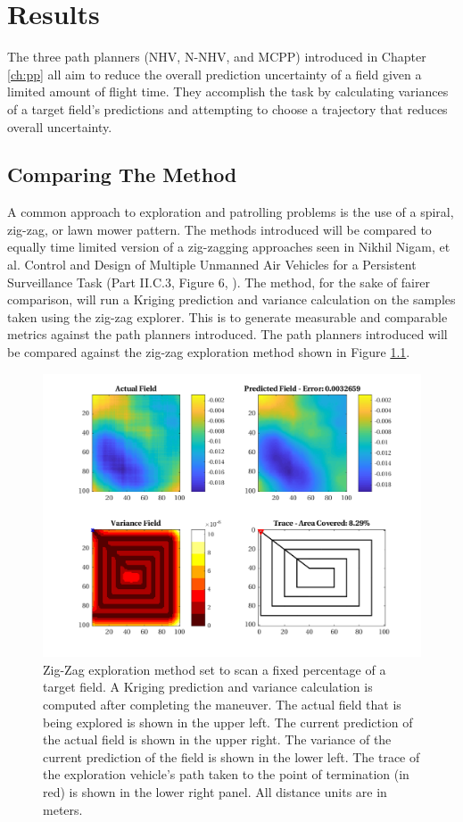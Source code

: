 \chapter{Results}
The three path planners (NHV, N-NHV, and MCPP) introduced in Chapter \ref{ch:pp} all aim to reduce the overall prediction uncertainty of a field given a limited amount of flight time. They accomplish the task by calculating variances of a target field's predictions and attempting to choose a trajectory that reduces overall uncertainty. 

\section{Comparing The Method}
A common approach to exploration and patrolling problems is the use of a spiral, zig-zag, or lawn mower pattern. The methods introduced will be compared to equally time limited version of a zig-zagging approaches seen in Nikhil Nigam, et al. Control and Design of Multiple Unmanned Air Vehicles for a Persistent Surveillance Task (Part II.C.3, Figure 6, \cite{nigam:zigzag}). The method, for the sake of fairer comparison, will run a Kriging prediction and variance calculation on the samples taken using the zig-zag explorer. This is to generate measurable and comparable metrics against the path planners introduced. The path planners introduced will be compared against the zig-zag exploration method shown in Figure \ref{fig:zigzag4}.

\begin{figure}[hbt!]
    \centering
    \includegraphics[width=0.9\linewidth]{figures/hbresults/zz_10p_100x100_sf_25_seed_2.png}
    \captionsetup{skip=0.20\baselineskip,size=footnotesize}
    \caption{Zig-Zag exploration method set to scan a fixed percentage of a target field. A Kriging prediction and variance calculation is computed after completing the maneuver. The actual field that is being explored is shown in the upper left. The current prediction of the actual field is shown in the upper right. The variance of the current prediction of the field is shown in the lower left. The trace of the exploration vehicle's path taken to the point of termination (in red) is shown in the lower right panel. All distance units are in meters.}
    \label{fig:zigzag4}
\end{figure}

